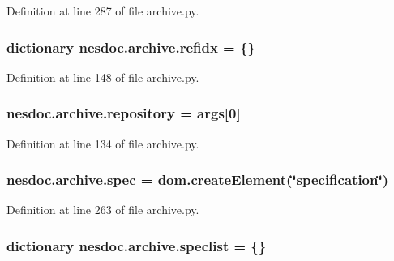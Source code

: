 Definition at line 287 of file archive.\+py.

\subsubsection[{\texorpdfstring{refidx}{refidx}}]{\setlength{\rightskip}{0pt plus 5cm}dictionary nesdoc.\+archive.\+refidx = \{\}}\hypertarget{namespacenesdoc_1_1archive_a7de5aa191c7e1c7dacc3f71f6d814057}{}\label{namespacenesdoc_1_1archive_a7de5aa191c7e1c7dacc3f71f6d814057}


Definition at line 148 of file archive.\+py.

\subsubsection[{\texorpdfstring{repository}{repository}}]{\setlength{\rightskip}{0pt plus 5cm}nesdoc.\+archive.\+repository = {\bf args}\mbox{[}0\mbox{]}}\hypertarget{namespacenesdoc_1_1archive_a0b434b5e284b049fa9af5523220dd992}{}\label{namespacenesdoc_1_1archive_a0b434b5e284b049fa9af5523220dd992}


Definition at line 134 of file archive.\+py.

\subsubsection[{\texorpdfstring{spec}{spec}}]{\setlength{\rightskip}{0pt plus 5cm}nesdoc.\+archive.\+spec = dom.\+create\+Element(\char`\"{}specification\char`\"{})}\hypertarget{namespacenesdoc_1_1archive_a0f41a3fb5ea22d59ffc61067548753a0}{}\label{namespacenesdoc_1_1archive_a0f41a3fb5ea22d59ffc61067548753a0}


Definition at line 263 of file archive.\+py.

\subsubsection[{\texorpdfstring{speclist}{speclist}}]{\setlength{\rightskip}{0pt plus 5cm}dictionary nesdoc.\+archive.\+speclist = \{\}}\hypertarget{namespacenesdoc_1_1archive_aa1bbf58fc5d0993fc0969f41f64ccbda}{}\label{namespacenesdoc_1_1archive_aa1bbf58fc5d0993fc0969f41f64ccbda}


